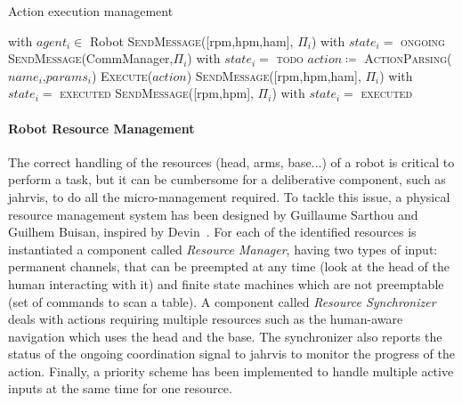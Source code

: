 \documentclass[a4paper,11pt,twoside]{StyleThese}
\begin{document}
\begin{algorithm}[!htb]
	\caption{Action execution management}
	\label{chap6:algo:exe_manage}
	\begin{algorithmic}
	 with $agent_i \in$ Robot
		\State \textsc{SendMessage}([\acrshort{rpm},\acrshort{hpm},\acrshort{ham}], $\Pi_i$) with $state_i=$ \textsc{ongoing}
		\State {}
		\State \textsc{SendMessage}(CommManager,$\Pi_i$) with $state_i=$ \textsc{todo}
	\EndIf
	\State $action \coloneqq$ \textsc{ActionParsing($name_i$,$params_i$)}
	\State \textsc{Execute($action$)}
		\State \textsc{SendMessage}([\acrshort{rpm},\acrshort{hpm},\acrshort{ham}], $\Pi_i$) with $state_i=$ \textsc{executed}
		\State \textsc{SendMessage}([\acrshort{rpm},\acrshort{hpm}], $\Pi_i$) with $state_i=$ \textsc{executed}
	\EndIf
	\EndFunction
	\end{algorithmic}
\end{algorithm}	



\paragraph{Robot Resource Management}\label{chap6:para:resource_m}

The correct handling of the resources (head, arms, base...) of a robot is critical to perform a task, but it can be cumbersome for a deliberative component, such as \acrshort{jahrvis}, to do all the micro-management required. To tackle this issue, a physical resource management system has been designed by Guillaume Sarthou and Guilhem Buisan, inspired by Devin~\cite{devin_2017_decisional}. For each of the identified resources is instantiated a component called \emph{Resource Manager}, having two types of input: permanent channels, that can be preempted at any time (\eg look at the head of the human interacting with it) and finite state machines which are not preemptable (\eg set of commands to scan a table). A component called \emph{Resource Synchronizer} deals with actions requiring multiple resources such as the human-aware navigation which uses the head and the base. The synchronizer also reports the status of the ongoing coordination signal to \acrshort{jahrvis} to monitor the progress of the action. Finally, a priority scheme has been implemented to handle multiple active inputs at the same time for one resource. 
\end{document}
